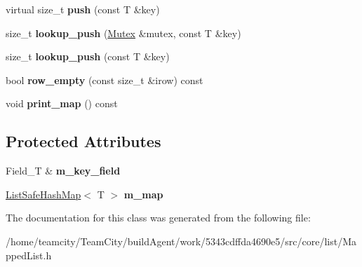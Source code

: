 \begin{DoxyCompactItemize}
\item 
virtual size\+\_\+t {\bfseries push} (const T \&key)\hypertarget{classMappedList_abc5b44b2f55df6a16bbe6855c49356fc}{}\label{classMappedList_abc5b44b2f55df6a16bbe6855c49356fc}

\item 
size\+\_\+t {\bfseries lookup\+\_\+push} (\hyperlink{classMutex}{Mutex} \&mutex, const T \&key)\hypertarget{classMappedList_aaae82638ef8160fd252aee948deb836b}{}\label{classMappedList_aaae82638ef8160fd252aee948deb836b}

\item 
size\+\_\+t {\bfseries lookup\+\_\+push} (const T \&key)\hypertarget{classMappedList_ac48383eb9b61a4ff5666b8c1563afd10}{}\label{classMappedList_ac48383eb9b61a4ff5666b8c1563afd10}

\item 
bool {\bfseries row\+\_\+empty} (const size\+\_\+t \&irow) const \hypertarget{classMappedList_a773ada4e3e7b0e8a911ca6d2cdb3df01}{}\label{classMappedList_a773ada4e3e7b0e8a911ca6d2cdb3df01}

\item 
void {\bfseries print\+\_\+map} () const \hypertarget{classMappedList_ac758852dea11206bbf7ca07e2b1d3278}{}\label{classMappedList_ac758852dea11206bbf7ca07e2b1d3278}

\end{DoxyCompactItemize}
\subsection*{Protected Attributes}
\begin{DoxyCompactItemize}
\item 
Field\+\_\+T \& {\bfseries m\+\_\+key\+\_\+field}\hypertarget{classMappedList_a3a0930ba978562dc442f5dfca581d162}{}\label{classMappedList_a3a0930ba978562dc442f5dfca581d162}

\item 
\hyperlink{structListSafeHashMap}{List\+Safe\+Hash\+Map}$<$ T $>$ {\bfseries m\+\_\+map}\hypertarget{classMappedList_ac3a5b493e331554f3cb950fd2e0953be}{}\label{classMappedList_ac3a5b493e331554f3cb950fd2e0953be}

\end{DoxyCompactItemize}


The documentation for this class was generated from the following file\+:\begin{DoxyCompactItemize}
\item 
/home/teamcity/\+Team\+City/build\+Agent/work/5343cdffda4690e5/src/core/list/Mapped\+List.\+h\end{DoxyCompactItemize}

